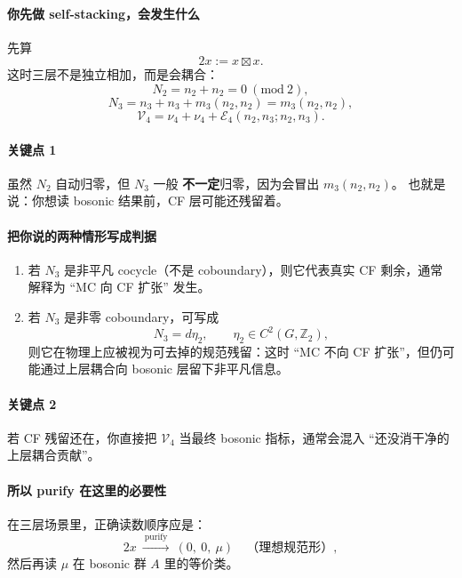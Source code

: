 \documentclass[a4paper,fontset=ubuntu,12pt]{ctexart}
\begin{document}
\paragraph{你先做 self-stacking，会发生什么}
先算
\begin{equation}
2x:=x\boxtimes x.
\label{eq:2x-def}
\end{equation}
这时三层不是独立相加，而是会耦合：
\begin{equation}
N_2=n_2+n_2=0\ (\mathrm{mod}\ 2),
\label{eq:N2-self}
\end{equation}
\begin{equation}
N_3=n_3+n_3+m_3(n_2,n_2)=m_3(n_2,n_2),
\label{eq:N3-self}
\end{equation}
\begin{equation}
\mathcal{V}_4=\nu_4+\nu_4+\mathcal{E}_4(n_2,n_3;n_2,n_3).
\label{eq:V4-self}
\end{equation}

\paragraph{关键点 1}
虽然 $N_2$ 自动归零，但 $N_3$ 一般 \textbf{不一定}归零，因为会冒出 $m_3(n_2,n_2)$。
也就是说：你想读 bosonic 结果前，CF 层可能还残留着。

\paragraph{把你说的两种情形写成判据}
\begin{enumerate}
\item 若 $N_3$ 是非平凡 cocycle（不是 coboundary），则它代表真实 CF 剩余，通常解释为 ``MC 向 CF 扩张'' 发生。
\item 若 $N_3$ 是非零 coboundary，可写成
\begin{equation}
N_3=d\eta_2,\qquad \eta_2\in C^2(G,\mathbb{Z}_2),
\label{eq:N3-deta2}
\end{equation}
则它在物理上应被视为可去掉的规范残留：这时 ``MC 不向 CF 扩张''，但仍可能通过上层耦合向 bosonic 层留下非平凡信息。
\end{enumerate}

\paragraph{关键点 2}
若 CF 残留还在，你直接把 $\mathcal{V}_4$ 当最终 bosonic 指标，通常会混入 ``还没消干净的上层耦合贡献''。

\paragraph{所以 purify 在这里的必要性}
在三层场景里，正确读数顺序应是：
\begin{equation}
2x\ \xrightarrow{\ \text{purify}\ }\ (0,\ 0,\ \mu)\quad\text{（理想规范形）},
\label{eq:2x-purify-mu}
\end{equation}
然后再读 $\mu$ 在 bosonic 群 $A$ 里的等价类。
\end{document}
